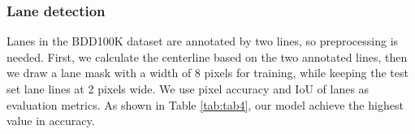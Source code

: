 \documentclass[10pt,twocolumn,letterpaper]{article}
\begin{document}
\begin{table}[htbp]
    \footnotesize
    \begin{center}
    \end{center}
    \caption{Results on drivable area segment.}
    \label{tab:tab3}
\end{table}

\subsubsection{Lane detection}
Lanes in the BDD100K dataset are annotated by two lines, so preprocessing is needed. First, we calculate the centerline based on the two annotated lines, then we draw a lane mask with a width of 8 pixels for training, while keeping the test set lane lines at 2 pixels wide. We use pixel accuracy and IoU of lanes as evaluation metrics. As shown in Table \ref{tab:tab4}, our model achieve the highest value in accuracy.
\end{document}
